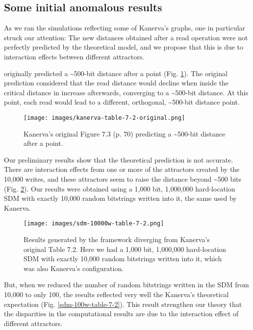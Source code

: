 \subsection{Some initial anomalous results}

As we ran the simulations reflecting some of Kanerva's graphs, one in particular struck our attention:  The new distances obtained after a read operation were not perfectly predicted by the theoretical model, and we propose that this is due to interaction effects between different attractors.

\citet{Kanerva1988} originally predicted a \textasciitilde 500-bit distance after a point (Fig. \ref{kanerva-table-7-2}). The original prediction considered that the read distance would decline when inside the critical distance in increase afterwards, converging to a \textasciitilde 500-bit distance.  At this point, each read would lead to a different, orthogonal, \textasciitilde 500-bit distance point.

\begin{figure}[h]
\centering\texttt{[image: images/kanerva-table-7-2-original.png]}
\caption{Kanerva's original Figure 7.3 (p. 70) predicting a \textasciitilde 500-bit distance after a point.
\label{kanerva-table-7-2}}
\end{figure}

Our preliminary results show that the theoretical prediction is not accurate.  There are interaction effects from one or more of the attractors created by the 10,000 writes, and these attractors seem to raise the distance beyond \textasciitilde 500 bits (Fig. \ref{sdm-10000w-table-7-2}). Our results were obtained using a 1,000 bit, 1,000,000 hard-location SDM with exactly 10,000 random bitstrings written into it, the same used by Kanerva.

\begin{figure}[h]
\centering\texttt{[image: images/sdm-10000w-table-7-2.png]}
\caption{Results generated by the framework diverging from Kanerva's original Table 7.2. Here we had a 1,000 bit, 1,000,000 hard-location SDM with exactly 10,000 random bitstrings written into it, which was also Kanerva's configuration.
\label{sdm-10000w-table-7-2}}
\end{figure}

But, when we reduced the number of random bitstrings written in the SDM from 10,000 to only 100, the results reflected very well the Kanerva's theoretical expectation (Fig. \ref{sdm-100w-table-7-2}). This result strengthen our theory that the disparities in the computational results are due to the interaction effect of different attractors.


